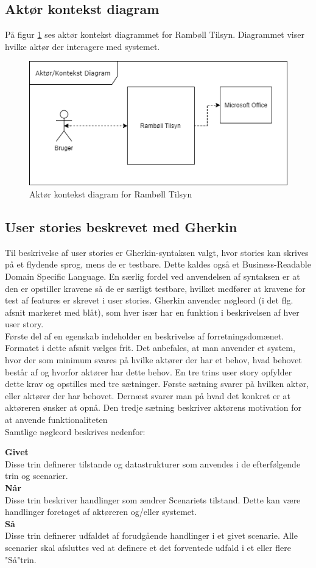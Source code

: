 \subsection{Aktør kontekst diagram}\label{sec:Aktor}
	På figur \ref{fig:AktorKontekst} ses aktør kontekst diagrammet for Rambøll Tilsyn. Diagrammet viser hvilke aktør der interagere med systemet.
\begin{figure}[H]
	\centering
	\includegraphics[width=0.5\linewidth]{Kravspecifikation/AktorDiagram}
	\caption{Aktør kontekst diagram for Rambøll Tilsyn}
	\label{fig:AktorKontekst}
\end{figure}


\subsection{User stories beskrevet med Gherkin}
Til beskrivelse af user stories er Gherkin-syntaksen valgt, hvor stories 
kan skrives på et flydende sprog, mens de er testbare.\cite{Gherkin} Dette kaldes også et Business-Readable Domain  
Specific Language. En særlig fordel ved anvendelsen af syntaksen er at den er opstiller kravene så de er særligt testbare, hvilket medfører at kravene for test af features er skrevet i user stories.
Gherkin anvender nøgleord (i det flg. afsnit 
markeret med blåt), som hver især har en funktion i beskrivelsen af hver 
user story.  \vspace{0.2 cm}\\
Første del af en egenskab indeholder en beskrivelse af forretningsdomænet. 
Formatet i	dette afsnit vælges frit. Det anbefales, at man anvender et 
system, hvor der som minimum svares på hvilke aktører der har et behov, hvad 
behovet består af og hvorfor aktører har dette behov. En tre trins user 
story opfylder dette krav og opstilles med tre 
sætninger. Første sætning svarer på hvilken aktør, eller aktører der har
behovet. Dernæst svarer man på hvad det konkret er at aktøreren ønsker at 
opnå. Den tredje sætning beskriver aktørens motivation for at anvende 
funktionaliteten\\
Samtlige nøgleord beskrives nedenfor:

\large{\textbf{Givet}}\\
Disse trin definerer tilstande og datastrukturer som anvendes i de 
efterfølgende trin og scenarier.\\
\large{\textbf{Når}}\\
Disse trin beskriver handlinger som ændrer Scenariets tilstand. Dette kan 
være handlinger	foretaget af aktøreren og/eller systemet.\\
\large{\textbf{Så}}\\
Disse trin definerer udfaldet af forudgående handlinger i et givet 
scenarie. Alle scenarier skal afsluttes ved at definere et det forventede 
udfald i et eller flere "Så"trin.\\

